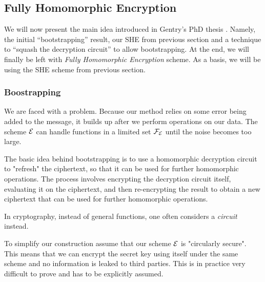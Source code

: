 \subsection{Fully Homomorphic Encryption}
We will now present the main idea introduced in Gentry's PhD thesis \cite{gentry_phd}. Namely, the initial ``bootstrapping'' result, our SHE from previous section and a technique to ``squash the decryption circuit'' to allow bootstrapping. At the end, we will finally be left with \textit{Fully Homomorphic Encryption} scheme. As a basis, we will be using the SHE scheme from previous section.

\subsubsection*{Boostrapping}
We are faced with a problem. Because our method relies on some error being added to the message, it builds up after we perform operations on our data. The scheme $\mathcal{E}$ can handle functions in a limited set $\mathcal{F}_{\mathcal{E}}$ until the noise becomes too large.

The basic idea behind bootstrapping is to use a homomorphic decryption circuit to "refresh" the ciphertext, so that it can be used for further homomorphic operations. The process involves encrypting the decryption circuit itself, evaluating it on the ciphertext, and then re-encrypting the result to obtain a new ciphertext that can be used for further homomorphic operations.

\begin{remark}
	In cryptography, instead of general functions, one often considers a \textit{circuit} instead. 
\end{remark}
To simplify our construction assume that our scheme $\mathcal{E}$ is "circularly secure". This means that we can encrypt the secret key using itself under the same scheme and no information is leaked to third parties. This is in practice very difficult to prove and has to be explicitly assumed. 
